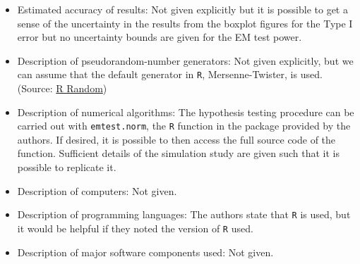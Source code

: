\documentclass{article}\usepackage[]{graphicx}\usepackage[]{color}
\begin{document}
\begin{itemize}
\item Estimated accuracy of results: Not given explicitly but it is possible to get a sense of the uncertainty in the results from the boxplot figures for the Type I error but no uncertainty bounds are given for the EM test power.
\item Description of pseudorandom-number generators: Not given explicitly, but we can assume that the default generator in \texttt{R}, Mersenne-Twister, is used. (Source: \href{http://stat.ethz.ch/R-manual/R-patched/library/base/html/Random.html}{R Random})
\item Description of numerical algorithms: The hypothesis testing procedure can be carried out with \texttt{emtest.norm}, the \texttt{R} function in the package provided by the authors. If desired, it is possible to then access the full source code of the function. Sufficient details of the simulation study are given such that it is possible to replicate it.
\item Description of computers: Not given.
\item Description of programming languages: The authors state that \texttt{R} is used, but it would be helpful if they noted the version of \texttt{R} used.
\item Description of major software components used: Not given.
\end{itemize}
\end{document}
